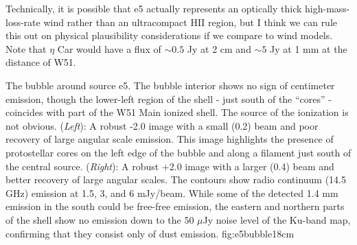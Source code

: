 \documentclass{aa}
\begin{document}
Technically, it is possible that e5 actually represents an optically thick
high-mass-loss-rate wind rather than an ultracompact HII region, but I think we
can rule this out on physical plausibility considerations if we compare to 
wind models.  Note that $\eta$ Car would have a flux of $\sim0.5$ Jy at 2 cm
and $\sim5$ Jy at 1 mm at the distance of W51.

{The bubble around source e5.  The bubble interior shows no sign of centimeter
emission, though the lower-left region of the shell - just south of the
``cores'' - coincides with part of the W51 Main ionized shell.  The source of
the ionization is not obvious.
({\it Left}): A robust -2.0 image with a small (0.2\arcsec) beam and poor
recovery of large angular scale emission.  This image highlights the presence
of protostellar cores on the left edge of the bubble and along a filament just
south of the central source.
({\it Right}): A robust +2.0 image with a larger (0.4\arcsec) beam and better
recovery of large angular scales.  The contours show radio continuum (14.5 GHz)
emission at 1.5, 3, and 6 mJy/beam.  While some of the detected 1.4 mm emission
in the south could be free-free emission, the eastern and northern parts of the
shell show no emission down to the 50 $\mu$Jy noise level of the Ku-band map,
confirming that they consist only of dust emission.
}{fig:e5bubble}{1}{8cm}
\end{document}
